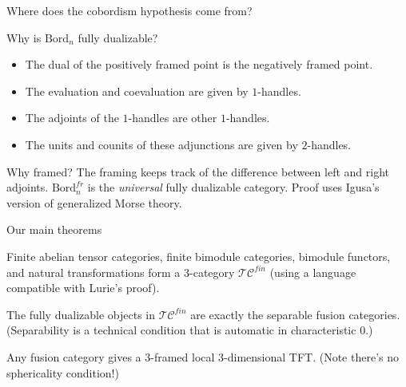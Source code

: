 \documentclass[beamer]{beamer}
\begin{document}
\begin{frame}{Where does the cobordism hypothesis come from?}
\begin{block}{Why is $\mathrm{Bord}_n$ fully dualizable?}
\begin{itemize}
\item The dual of the positively framed point is the negatively framed point.
\item The evaluation and coevaluation are given by $1$-handles.
\item The adjoints of the $1$-handles are other $1$-handles.
\item The units and counits of these adjunctions are given by $2$-handles.
\end{itemize}
\end{block}

\begin{block}{Why framed?}
The framing keeps track of the difference between left and right adjoints.  $\mathrm{Bord}_n^{fr}$ is the {\em universal} fully dualizable category.  Proof uses Igusa's version of generalized Morse theory.
\end{block}
\end{frame}

\begin{frame}{Our main theorems}
\begin{theorem}[DSPS]
Finite abelian tensor categories, finite bimodule categories, bimodule functors, and natural transformations form a $3$-category $\mathcal{TC}^{fin}$ (using a language compatible with Lurie's proof).
\end{theorem}

\begin{theorem}[DSPS]
The fully dualizable objects in $\mathcal{TC}^{fin}$ are exactly the separable fusion categories.  (Separability is a technical condition that is automatic in characteristic $0$.)
\end{theorem}

\begin{corollary}
Any fusion category gives a $3$-framed local $3$-dimensional TFT.  (Note there's no sphericality condition!)
\end{corollary}
\end{frame}
\end{document}
